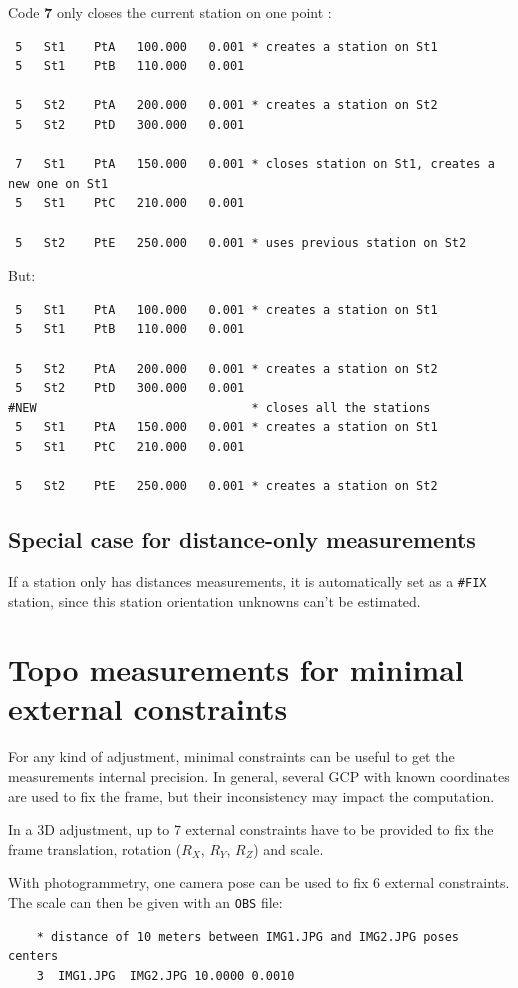 Code \textbf{7} only closes the current station on one point :
\begin{verbatim}
 5   St1    PtA   100.000   0.001 * creates a station on St1
 5   St1    PtB   110.000   0.001
 
 5   St2    PtA   200.000   0.001 * creates a station on St2
 5   St2    PtD   300.000   0.001

 7   St1    PtA   150.000   0.001 * closes station on St1, creates a new one on St1
 5   St1    PtC   210.000   0.001

 5   St2    PtE   250.000   0.001 * uses previous station on St2
\end{verbatim}
But:
\begin{verbatim}
 5   St1    PtA   100.000   0.001 * creates a station on St1
 5   St1    PtB   110.000   0.001
 
 5   St2    PtA   200.000   0.001 * creates a station on St2
 5   St2    PtD   300.000   0.001
#NEW                              * closes all the stations
 5   St1    PtA   150.000   0.001 * creates a station on St1
 5   St1    PtC   210.000   0.001

 5   St2    PtE   250.000   0.001 * creates a station on St2
\end{verbatim}


\subsection{Special case for distance-only measurements}

If a station only has distances measurements, it is automatically
set as a \texttt{\#FIX} station, since this station orientation unknowns
can't be estimated.


\section{Topo measurements for minimal external constraints}

For any kind of adjustment, minimal constraints can be useful to get the measurements internal precision.
In general, several GCP with known coordinates are used to fix the frame, but their inconsistency may
impact the computation.

In a 3D adjustment, up to 7 external constraints have to be provided to fix the frame translation, rotation ($R_X$, $R_Y$, $R_Z$) and scale.

With photogrammetry, one camera pose can be used to fix 6 external constraints. The scale can then be given with an \texttt{OBS} file:
\begin{verbatim}
    * distance of 10 meters between IMG1.JPG and IMG2.JPG poses centers
    3  IMG1.JPG  IMG2.JPG 10.0000 0.0010   
\end{verbatim}

